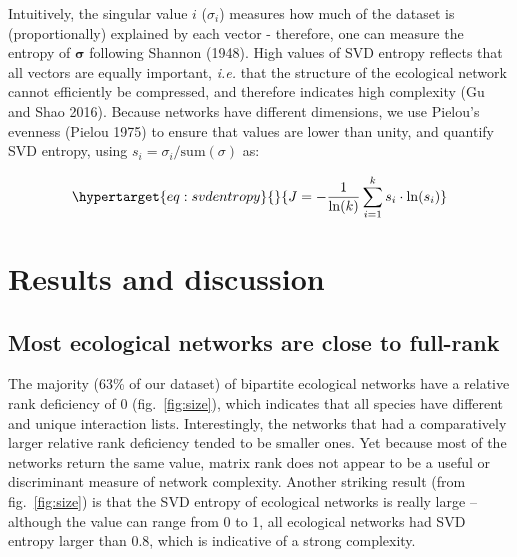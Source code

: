 \documentclass[11pt]{article}
\begin{document}
Intuitively, the singular value \(i\) (\(\sigma_i\)) measures how much
of the dataset is (proportionally) explained by each vector - therefore,
one can measure the entropy of \(\mathbf{\sigma}\) following Shannon
(1948). High values of SVD entropy reflects that all vectors are equally
important, \emph{i.e.} that the structure of the ecological network
cannot efficiently be compressed, and therefore indicates high
complexity (Gu and Shao 2016). Because networks have different
dimensions, we use Pielou's evenness (Pielou 1975) to ensure that values
are lower than unity, and quantify SVD entropy, using
\(s_i = \sigma_i/\text{sum}(\sigma)\) as:

\begin{equation}\protect\hypertarget{eq:svdentropy}{}{J = -\frac{1}{\ln(k)}\sum_{i=1}^k s_i\cdot\ln(s_i)}\label{eq:svdentropy}\end{equation}

\hypertarget{results-and-discussion}{%
\section{Results and discussion}\label{results-and-discussion}}

\hypertarget{most-ecological-networks-are-close-to-full-rank}{%
\subsection{Most ecological networks are close to
full-rank}\label{most-ecological-networks-are-close-to-full-rank}}

The majority (63\% of our dataset) of bipartite ecological networks have
a relative rank deficiency of 0 (fig.~\ref{fig:size}), which indicates
that all species have different and unique interaction lists.
Interestingly, the networks that had a comparatively larger relative
rank deficiency tended to be smaller ones. Yet because most of the
networks return the same value, matrix rank does not appear to be a
useful or discriminant measure of network complexity. Another striking
result (from fig.~\ref{fig:size}) is that the SVD entropy of ecological
networks is really large -- although the value can range from 0 to 1,
all ecological networks had SVD entropy larger than 0.8, which is
indicative of a strong complexity.
\end{document}
